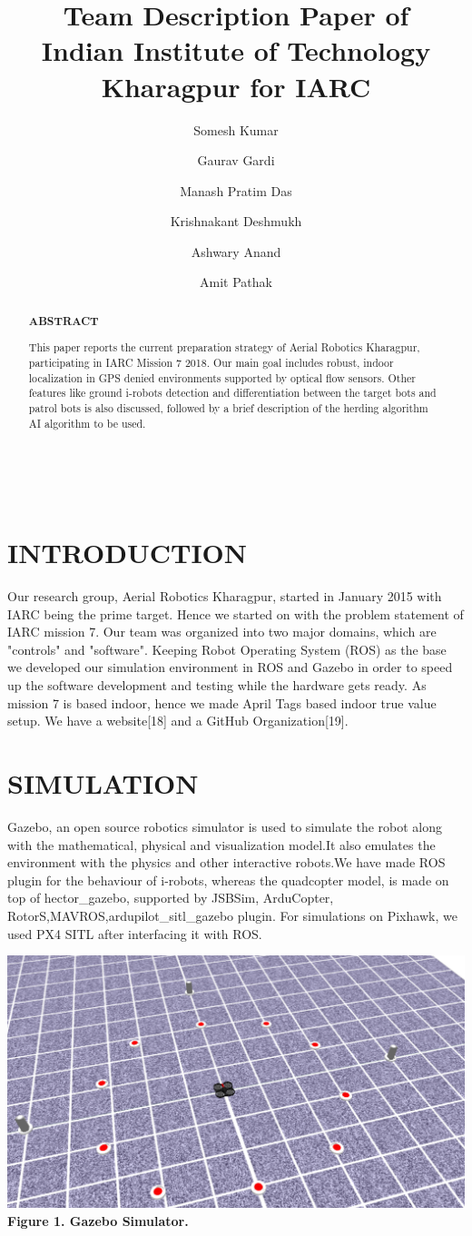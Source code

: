 \documentclass[12pt]{article}
\title{Team Description Paper of \\
Indian Institute of Technology Kharagpur for IARC}
\author[1]{Somesh Kumar}
\author[2]{Gaurav Gardi}
\author[2]{Manash Pratim Das}
\author[2]{Krishnakant Deshmukh}
\author[2]{Ashwary Anand}
\author[2]{Amit Pathak}
\affil[1]{Professor\\ Depeartment of Mathematics\\Indian Institute of Technology, Kharagpur}
\affil[2]{Students\\ Indian Institute of Technology, Kharagpur}
\begin{document}
\maketitle
\\

\begin{abstract}

\begin{center}\textbf{ABSTRACT}\end{center}
This paper reports the current preparation strategy of Aerial Robotics Kharagpur,
participating in IARC Mission 7 2018. Our main goal includes robust, indoor 
localization in GPS denied environments supported by optical flow sensors. 
Other features like ground i-robots detection and differentiation between the 
target bots and patrol bots is also discussed, followed by a brief description 
of the herding algorithm AI algorithm to be used.
\end{abstract}
\section{INTRODUCTION}
Our research group, Aerial Robotics Kharagpur, started in January 2015 with IARC 
being the prime target. Hence we started on with the problem statement of IARC 
mission 7. Our team was organized into two major domains, which are "controls" 
and "software". Keeping Robot Operating System (ROS) as the base we developed 
our simulation environment in ROS and Gazebo in order to speed up the software 
development and testing while the hardware gets ready. As mission 7 is based 
indoor, hence we made April Tags based indoor true value setup. We have a website[18] 
and a GitHub Organization[19].
\section{SIMULATION}
Gazebo, an open source robotics simulator is used to simulate the robot along with the mathematical, physical and visualization model.It also emulates the environment with the physics and other interactive robots.We have made ROS plugin for the behaviour of i-robots, whereas the quadcopter model,
is made on top of hector\_gazebo, supported by JSBSim, ArduCopter, RotorS,MAVROS,ardupilot\_sitl\_gazebo plugin. For simulations on Pixhawk, we used PX4 SITL after interfacing it with ROS.
\begin{center}\includegraphics[scale=0.15]{sim} \\
\textbf{Figure 1. Gazebo Simulator.}\end{center}
\end{document}
